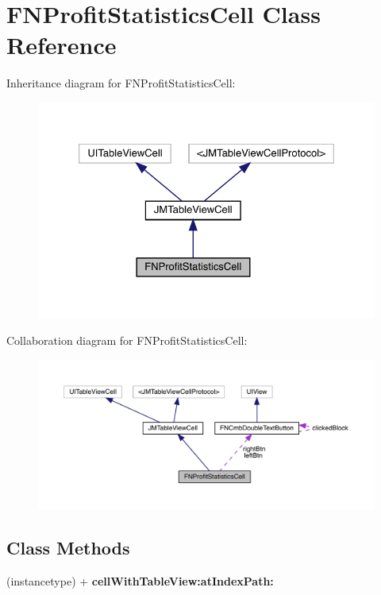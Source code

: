 \hypertarget{interface_f_n_profit_statistics_cell}{}\section{F\+N\+Profit\+Statistics\+Cell Class Reference}
\label{interface_f_n_profit_statistics_cell}


Inheritance diagram for F\+N\+Profit\+Statistics\+Cell\+:\nopagebreak
\begin{figure}[H]
\begin{center}
\leavevmode
\includegraphics[width=326pt]{interface_f_n_profit_statistics_cell__inherit__graph}
\end{center}
\end{figure}


Collaboration diagram for F\+N\+Profit\+Statistics\+Cell\+:\nopagebreak
\begin{figure}[H]
\begin{center}
\leavevmode
\includegraphics[width=350pt]{interface_f_n_profit_statistics_cell__coll__graph}
\end{center}
\end{figure}
\subsection*{Class Methods}
\begin{DoxyCompactItemize}
\item 
\mbox{\label{interface_f_n_profit_statistics_cell_a662897ff7cdca4c4ba2807b0918a61c9}} 
(instancetype) + {\bfseries cell\+With\+Table\+View\+:at\+Index\+Path\+:}
\end{DoxyCompactItemize}
